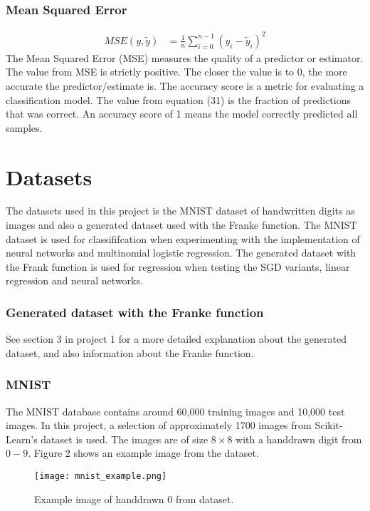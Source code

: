 \documentclass[a4paper,twocolumn]{article}
\begin{document}
\subsubsection{Mean Squared Error}
\begin{align}
        MSE(y, \widetilde{y}) &= \frac{1}{n}\sum_{i=0}^{n-1}(y_{i} - \widetilde{y}_{i})^{2}
\end{align}
The Mean Squared Error (MSE) measures the quality of a predictor or estimator. The value from MSE is strictly positive. The closer the value is to 0, the more accurate the predictor/estimate is. The accuracy score is a metric for evaluating a classification model. The value from equation (31) is the fraction of predictions that was correct. An accuracy score of 1 means the model correctly predicted all samples.
\section{Datasets}
The datasets used in this project is the MNIST dataset of handwritten digits as images and also a generated dataset used with the Franke function. The MNIST dataset is used for classififcation when experimenting with the implementation of neural networks and multinomial logistic regression. The generated dataset with the Frank function is used for regression when testing the SGD variants, linear regression and neural networks.
\subsubsection{Generated dataset with the Franke function}
See section 3 in project 1 for a more detailed explanation about the generated dataset, and also information about the Franke function.\cite{project1} 
\subsubsection{MNIST}
The MNIST database contains around 60,000 training images and 10,000 test images. In this project, a selection of approximately 1700 images from Scikit-Learn's dataset is used. The images are of size $8 \times 8$ with a handdrawn digit from $0-9$. Figure 2 shows an example image from the dataset.
\begin{figure}[ht]
    \centering
    \texttt{[image: mnist\_example.png]}
    \caption{Example image of handdrawn 0 from dataset.}
\end{figure}
\end{document}
